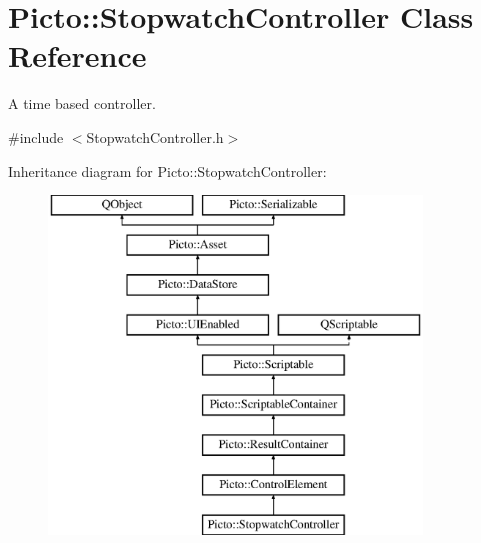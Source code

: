 \hypertarget{class_picto_1_1_stopwatch_controller}{\section{Picto\-:\-:Stopwatch\-Controller Class Reference}
\label{class_picto_1_1_stopwatch_controller}
}


A time based controller.  




{\ttfamily \#include $<$Stopwatch\-Controller.\-h$>$}

Inheritance diagram for Picto\-:\-:Stopwatch\-Controller\-:\begin{figure}[H]
\begin{center}
\leavevmode
\includegraphics[height=9.000000cm]{class_picto_1_1_stopwatch_controller}
\end{center}
\end{figure}
